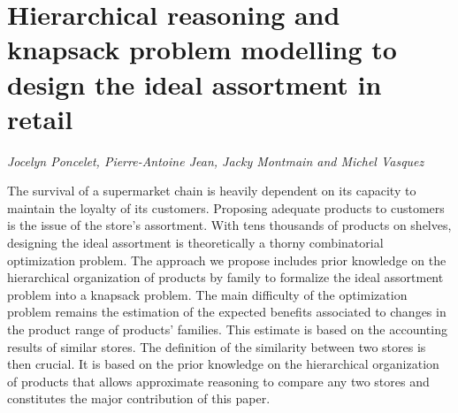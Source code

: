 \documentclass[../booklet.tex]{subfiles}
\begin{document}
\section[Hierarchical reasoning and knapsack problem modelling to design the ideal assortment in retail. {\it Jocelyn Poncelet, Pierre-Antoine Jean, Jacky Montmain and Michel Vasquez}]{Hierarchical reasoning and knapsack problem modelling to design the ideal assortment in retail}
   

\begin{center}
  {\it Jocelyn Poncelet, Pierre-Antoine Jean, Jacky Montmain and Michel Vasquez}
\end{center}

\vskip 0.8cm


The survival of a supermarket chain is heavily dependent on its capacity to maintain the loyalty of its customers. Proposing adequate products to customers is the issue of the store's assortment. With tens thousands of products on shelves, designing the ideal assortment is theoretically a thorny combinatorial optimization problem. The approach we propose includes prior knowledge on the hierarchical organization of products by family to formalize the ideal assortment problem into a knapsack problem. The main difficulty of the optimization problem remains the estimation of the expected benefits associated to changes in the product range of products' families. This estimate is based on the accounting results of similar stores. The definition of the similarity between two stores is then crucial. It is based on the prior knowledge on the hierarchical organization of products that allows approximate reasoning to compare any two stores and constitutes the major contribution of this paper.
\end{document}

